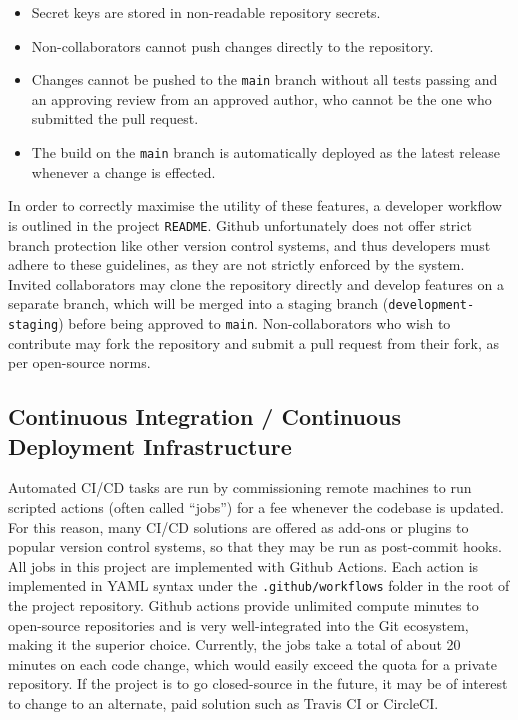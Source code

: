\begin{itemize}
    \item Secret keys are stored in non-readable repository secrets.
    \item Non-collaborators cannot push changes directly to the repository.
    \item Changes cannot be pushed to the \texttt{main} branch without all tests passing and an approving review from an approved author, who cannot be the one who submitted the pull request.
    \item The build on the \texttt{main} branch is automatically deployed as the latest release whenever a change is effected.
\end{itemize}

In order to correctly maximise the utility of these features, a developer workflow is outlined in the project \texttt{README}. Github unfortunately does not offer strict branch protection like other version control systems, and thus developers must adhere to these guidelines, as they are not strictly enforced by the system. Invited collaborators may clone the repository directly and develop features on a separate branch, which will be merged into a staging branch (\texttt{development-staging}) before being approved to \texttt{main}. Non-collaborators who wish to contribute may fork the repository and submit a pull request from their fork, as per open-source norms.


\subsection{Continuous Integration / Continuous Deployment Infrastructure}
Automated CI/CD tasks are run by commissioning remote machines to run scripted actions (often called ``jobs'') for a fee whenever the codebase is updated. For this reason, many CI/CD solutions are offered as add-ons or plugins to popular version control systems, so that they may be run as post-commit hooks. All jobs in this project are implemented with Github Actions. Each action is implemented in YAML syntax under the \texttt{.github/workflows} folder in the root of the project repository. Github actions provide unlimited compute minutes to open-source repositories and is very well-integrated into the Git ecosystem, making it the superior choice. Currently, the jobs take a total of about 20 minutes on each code change, which would easily exceed the quota for a private repository. If the project is to go closed-source in the future, it may be of interest to change to an alternate, paid solution such as Travis CI or CircleCI.


